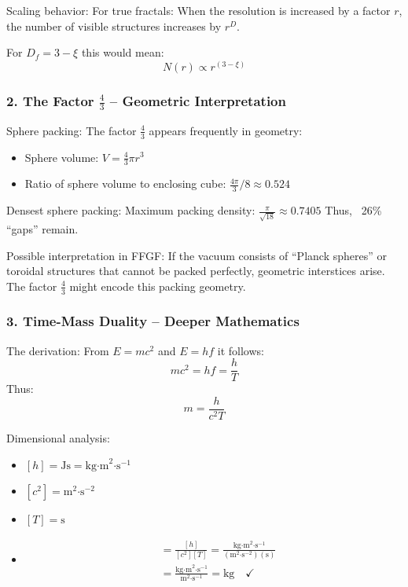 	Scaling behavior:
	For true fractals: When the resolution is increased by a factor \( r \), the number of visible structures increases by \( r^D \).
	
	For \( D_f = 3 - \xi \) this would mean:
	\[
	N(r) \propto r^{(3-\xi)}
	\]
	
	\subsubsection{2. The Factor \( \frac{4}{3} \) – Geometric Interpretation}
	Sphere packing:
	The factor \( \frac{4}{3} \) appears frequently in geometry:
	\begin{itemize}
		\item Sphere volume: \( V = \frac{4}{3}\pi r^3 \)
		\item Ratio of sphere volume to enclosing cube: \( \frac{4\pi}{3}/8 \approx 0.524 \)
	\end{itemize}
	
	Densest sphere packing:
	Maximum packing density: \( \frac{\pi}{\sqrt{18}} \approx 0.7405 \)
	Thus, ~26\% ``gaps'' remain.
	
	Possible interpretation in FFGF:
	If the vacuum consists of ``Planck spheres'' or toroidal structures that cannot be packed perfectly, geometric interstices arise. The factor \( \frac{4}{3} \) might encode this packing geometry.
	
	\subsubsection{3. Time-Mass Duality – Deeper Mathematics}
	The derivation:
	From \( E = mc^2 \) and \( E = hf \) it follows:
	\[
	mc^2 = hf = \frac{h}{T}
	\]
	Thus:
	\[
	m = \frac{h}{c^2 T}
	\]
	
	Dimensional analysis:
	\begin{itemize}
		\item \( [h] = \text{Js} = \text{kg·m}^2\text{·s}^{-1} \)
		\item \( [c^2] = \text{m}^2\text{·s}^{-2} \)
		\item \( [T] = \text{s} \)
		\item \begin{align}
			[m] &= \frac{[h]}{[c^2][T]} = \frac{\text{kg·m}^2\text{·s}^{-1}}{(\text{m}^2\text{·s}^{-2})(\text{s})} \\
			&= \frac{\text{kg·m}^2\text{·s}^{-1}}{\text{m}^2\text{·s}^{-1}} = \text{kg} \quad \checkmark
		\end{align}
	\end{itemize}
	

